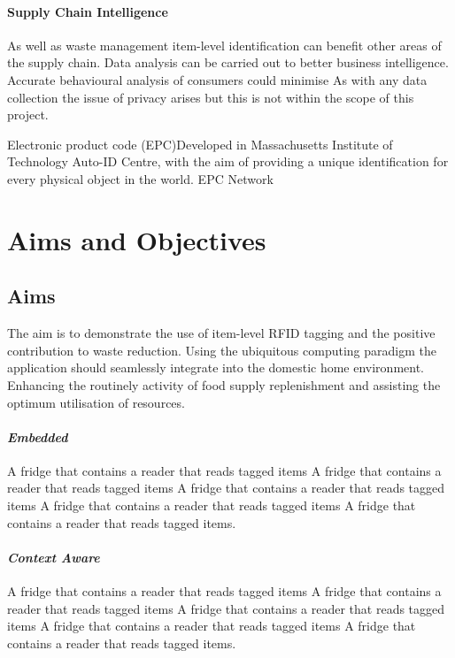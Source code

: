 \documentclass[a4paper, 11pt]{article}
\begin{document}
\paragraph{Supply Chain Intelligence} As well as waste management item-level identification can benefit other areas of the supply chain. Data analysis can be carried out to better business intelligence. Accurate behavioural analysis of consumers could minimise 
As with any data collection the issue of privacy arises but this is not within the scope of this project. 

Electronic product code (EPC)Developed in Massachusetts Institute of Technology Auto-ID Centre, with the aim of providing a unique identification for every physical object in the world. EPC Network

\clearpage
\section{Aims and Objectives}
\subsection{Aims}

The aim is to demonstrate the use of item-level RFID tagging and the positive contribution to waste reduction. Using the ubiquitous computing paradigm the application should seamlessly integrate into the domestic home environment. Enhancing the routinely activity of food supply replenishment and assisting the optimum utilisation of resources. 


\iffalse
 \paragraph{\textbf{\textit{Embedded}}}
 \begin{flushleft}  A fridge that contains a reader that reads tagged items A fridge that contains a reader that reads tagged items A fridge that contains a reader that reads tagged items A fridge that contains a reader that reads tagged items A fridge that contains a reader that reads tagged items.
  \end{flushleft}
  
   \paragraph{\textbf{\textit{Context Aware}}}
 \begin{flushleft}  A fridge that contains a reader that reads tagged items A fridge that contains a reader that reads tagged items A fridge that contains a reader that reads tagged items A fridge that contains a reader that reads tagged items A fridge that contains a reader that reads tagged items.
  \end{flushleft}
  
\end{document}
